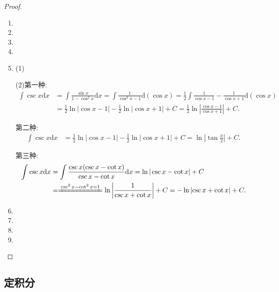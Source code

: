 \documentclass[../../main.tex]{subfiles}
\begin{document}
\begin{proof}
\begin{enumerate}
\item 

\item 

\item 

\item 

\item (1)

(2)第一种:
\begin{align*}
\int \csc x \mathrm{d}x &= \int \frac{\sin x}{1 - \cos^2 x} \mathrm{d}x = \int \frac{1}{\cos^2 x - 1} \mathrm{d}(\cos x) = \frac{1}{2}
\int \frac{1}{\cos x - 1} - \frac{1}{\cos x + 1} \mathrm{d}(\cos x) \\
&= \frac{1}{2}\ln|\cos x - 1| - \frac{1}{2}\ln|\cos x + 1| + C=\frac{1}{2}\ln \left| \frac{\cos x-1}{\cos x+1} \right|+C.
\end{align*}

第二种:
\begin{align*}
\int \csc x \mathrm{d}x &= \frac{1}{2}\ln|\cos x - 1| - \frac{1}{2}\ln|\cos x + 1| + C = \ln|\tan \frac{x}{2}| + C.
\end{align*}

第三种:
\begin{align*}
\int \csc x \mathrm{d}x &= \int \frac{\csc x(\csc x - \cot x)}{\csc x - \cot x} \mathrm{d}x = \ln|\csc x - \cot x| + C\\
&=\xlongequal{\csc ^2x-\cot ^2x=1}\ln \left| \frac{1}{\csc x+\cot x} \right|+C
=-\ln \left| \csc x+\cot x \right|+C.
\end{align*}

\item 

\item 

\item 

\item 
\end{enumerate}

\end{proof}


\subsection{定积分}
\end{document}
